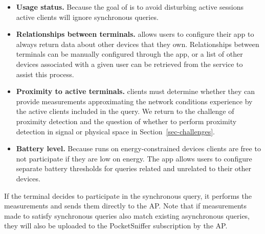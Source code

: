 \begin{itemize}

\item \textbf{Usage status.} Because the goal of \PS{} is to avoid disturbing
active sessions active clients will ignore synchronous queries.

\item \textbf{Relationships between terminals.} \PS{} allows users to
configure their app to always return data about other devices that they own.
Relationships between terminals can be manually configured through the app,
or a list of other devices associated with a given user can be retrieved from
the \PS{} service to assist this process.

\item \textbf{Proximity to active terminals.} \PS{} clients must determine
whether they can provide measurements approximating the network conditions
experience by the active clients included in the query. We return to the
challenge of proximity detection and the question of whether to perform
proximity detection in signal or physical space in
Section~\ref{sec-challenges}.

\item \textbf{Battery level.} Because \PS{} runs on energy-constrained
  devices clients are free to not participate if they are low on energy. The
  \PS{} app allows users to configure separate battery thresholds for queries
  related and unrelated to their other devices.

\end{itemize}

If the terminal decides to participate in the synchronous query, it performs
the measurements and sends them directly to the AP. Note that if measurements
made to satisfy synchronous queries also match existing asynchronous queries,
they will also be uploaded to the PocketSniffer subscription by the AP.
